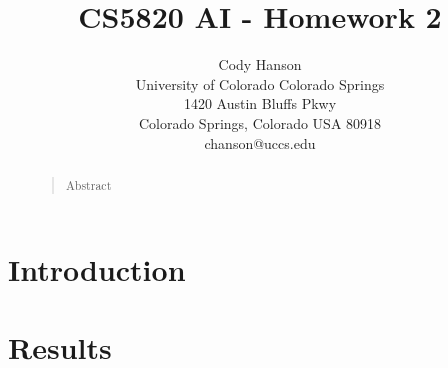 \documentclass[letterpaper]{article}
\begin{document}
\title{CS5820 AI - Homework 2}
\author{Cody Hanson\\
University of Colorado Colorado Springs\\
1420 Austin Bluffs Pkwy\\
Colorado Springs, Colorado USA 80918\\
chanson@uccs.edu}
\maketitle
\begin{abstract}
\begin{quote}
Abstract
\end{quote}
\end{abstract}

\section{Introduction}

\section{Results}



\onecolumn
\newpage
\end{document}
